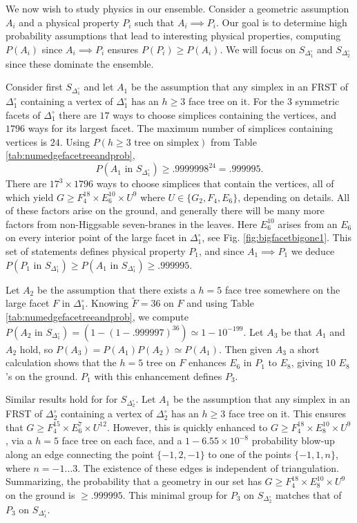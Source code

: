 \documentclass[aps,prl,twocolumn, superscriptaddress,groupedaddress,nofootinbib]{revtex4-1}
\newcommand{\sdoc}{S_{\Delta_1^\circ}}
\newcommand{\sdtc}{S_{\Delta_2^\circ}}
\newcommand{\doc}{{\Delta_1^\circ}}
\newcommand{\dtc}{{\Delta_2^\circ}}
\newcommand{\textin}{\,\, \text{in} \,\,}
\begin{document}
We now wish to study physics in
our ensemble. Consider a geometric assumption $A_i$
and a physical property $P_i$ such that $A_i\implies P_i$. Our goal is to determine high
probability assumptions that lead to interesting physical properties, computing $P(A_i)$
since $A_i\implies P_i$ ensures $P(P_i)\geq P(A_i).$ We will focus on $\sdoc$ and $\sdtc$ since
these dominate the ensemble.

Consider first $\sdoc$ and let $A_1$ be the assumption that any simplex in an FRST 
of $\doc$ containing a vertex of $\doc$ has an $h\geq 3$ face tree on it. 
For the $3$ symmetric facets of $\doc$ there are $17$ ways to choose simplices
containing the vertices, and $1796$ ways for its largest facet. The maximum
number of simplices containing vertices is $24$. Using $P(h\geq 3 \,\, \text{tree on simplex})$ from Table \ref{tab:numedgefacetreeandprob},
\begin{equation}
P(A_1\textin\sdoc)\geq .9999998^{24}=.999995.
\end{equation}
There are $17^3\times1796$ ways to choose simplices that contain the vertices,
all of which yield $G\geq F_4^{18}\times E_6^{10}\times U^9$ where 
$U\in\{G_2,F_4,E_6\}$, depending on details. All of these factors arise on
the ground, and generally there will be many more factors from non-Higgsable seven-branes
in the leaves. Here $E_6^{10}$ arises from an $E_6$ on every interior point
of the large facet in $\doc$, see Fig. \ref{fig:bigfacetbigone1}. This set of
statements defines physical property $P_1$, and since $A_1\implies P_1$
we deduce $P(P_1\textin \sdoc)\geq P(A_1\textin \sdoc) \geq .999995$.

Let $A_2$ be the assumption that there exists a $h=5$ face tree somewhere
on the large facet $F$ in $\doc$. Knowing $\tilde F=36$ on $F$ and using
Table \ref{tab:numedgefacetreeandprob}, we compute $P(A_2 \textin \sdoc)=(1-(1-.999997)^{36})\simeq 1-10^{-199}.$ Let $A_3$ be that $A_1$ and $A_2$ hold, so 
$P(A_3)=P(A_1)P(A_2)\simeq P(A_1)$. Then given $A_3$ a short calculation shows 
that the  $h=5$ tree on $F$ 
enhances $E_6$ in $P_1$ to $E_8$, giving $10$ $E_8$'s on the ground. $P_1$ with this enhancement defines $P_3$. 

Similar results hold for for $\sdtc$. Let $A_1$ be the assumption that any simplex in an FRST 
of $\dtc$ containing a vertex of $\dtc$ has an $h\geq 3$ face tree on it. This ensures that $G\geq F_4^{15}\times E_6^{7}\times U^{12}$. However, this is quickly enhanced to  $G\geq F_4^{18}\times E_8^{10}\times U^9$, via a $h=5$ face tree on each face, and a $1-6.55\times 10^{-8}$ probability blow-up along an edge connecting the point $\{-1, 2, -1\}$ to one of the points $\{-1, 1, n\}$, where $n = -1\dots 3$. The existence of these edges is independent of triangulation. Summarizing, the probability that a geometry in our set has
$G\geq F_4^{18}\times E_8^{10}\times U^9$ on the ground is $\geq .999995$. This minimal group
for $P_3$ on $\sdtc$ matches that of $P_3$ on $\sdoc$.
\end{document}
